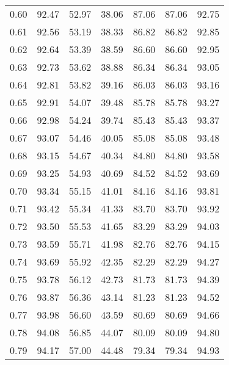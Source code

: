 \begin{tabular}{|c|c|c|c|c|c|c|}
      0.60 &     92.47 &     52.97 &      38.06 &   87.06 &      87.06 &         92.75 \\
      0.61 &     92.56 &     53.19 &      38.33 &   86.82 &      86.82 &         92.85 \\
      0.62 &     92.64 &     53.39 &      38.59 &   86.60 &      86.60 &         92.95 \\
      0.63 &     92.73 &     53.62 &      38.88 &   86.34 &      86.34 &         93.05 \\
      0.64 &     92.81 &     53.82 &      39.16 &   86.03 &      86.03 &         93.16 \\
      0.65 &     92.91 &     54.07 &      39.48 &   85.78 &      85.78 &         93.27 \\
      0.66 &     92.98 &     54.24 &      39.74 &   85.43 &      85.43 &         93.37 \\
      0.67 &     93.07 &     54.46 &      40.05 &   85.08 &      85.08 &         93.48 \\
      0.68 &     93.15 &     54.67 &      40.34 &   84.80 &      84.80 &         93.58 \\
      0.69 &     93.25 &     54.93 &      40.69 &   84.52 &      84.52 &         93.69 \\
      0.70 &     93.34 &     55.15 &      41.01 &   84.16 &      84.16 &         93.81 \\
      0.71 &     93.42 &     55.34 &      41.33 &   83.70 &      83.70 &         93.92 \\
      0.72 &     93.50 &     55.53 &      41.65 &   83.29 &      83.29 &         94.03 \\
      0.73 &     93.59 &     55.71 &      41.98 &   82.76 &      82.76 &         94.15 \\
      0.74 &     93.69 &     55.92 &      42.35 &   82.29 &      82.29 &         94.27 \\
      0.75 &     93.78 &     56.12 &      42.73 &   81.73 &      81.73 &         94.39 \\
      0.76 &     93.87 &     56.36 &      43.14 &   81.23 &      81.23 &         94.52 \\
      0.77 &     93.98 &     56.60 &      43.59 &   80.69 &      80.69 &         94.66 \\
      0.78 &     94.08 &     56.85 &      44.07 &   80.09 &      80.09 &         94.80 \\
      0.79 &     94.17 &     57.00 &      44.48 &   79.34 &      79.34 &         94.93 \\

\end{tabular}
